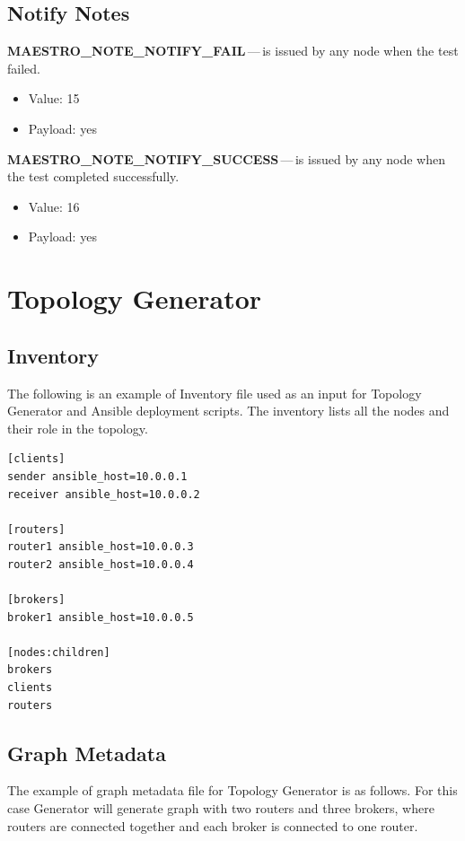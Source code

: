 \section*{Notify Notes}
\begin{description}
  \setlength\itemsep{0em}
  \item \textbf{MAESTRO\_NOTE\_NOTIFY\_FAIL}\,---\,is issued by any node when the test failed.
  \begin{itemize}
    \setlength\itemsep{0em}
    \item Value: 15
    \item Payload: yes
  \end{itemize}
  \item \textbf{MAESTRO\_NOTE\_NOTIFY\_SUCCESS}\,---\,is issued by any node when the test completed successfully.
  \begin{itemize}
    \setlength\itemsep{0em}
    \item Value: 16
    \item Payload: yes
  \end{itemize}
\end{description}


\chapter{Topology Generator} %

\section*{Inventory}
\label{AP:Inventory}
The following is an example of Inventory file used as an input for Topology Generator and Ansible deployment scripts. The inventory lists all the nodes and their role in the topology.

\begin{verbatim}
[clients]
sender ansible_host=10.0.0.1
receiver ansible_host=10.0.0.2

[routers]
router1 ansible_host=10.0.0.3
router2 ansible_host=10.0.0.4

[brokers]
broker1 ansible_host=10.0.0.5

[nodes:children]
brokers
clients
routers
\end{verbatim}

\section*{Graph Metadata}
\label{AP:Graph Metadata}
The example of graph metadata file for Topology Generator is as follows. For this case Generator will generate graph with two routers and three brokers, where routers are connected together and each broker is connected to one router.

